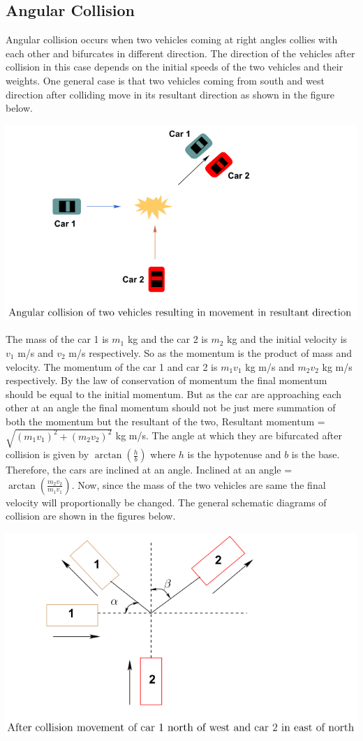 \subsection{Angular Collision}
Angular collision occurs when two vehicles coming at right angles collies with each other and bifurcates in different direction. The direction of the vehicles after collision in this case depends on the initial speeds of the two vehicles and their weights. One general case is that two vehicles coming from south and west direction after colliding move in its resultant direction as shown in the figure below.
\begin{center}
	\includegraphics[scale=0.5]{gfx/fig58.png}
\end{center}
The mass of the car 1 is $ m_1 $ kg and the car 2 is $ m_2 $ kg and the initial velocity is $ v_1 $ m/s and $ v_2 $ m/s respectively. So as the momentum is the product of mass and velocity. The momentum of the car 1 and car 2 is $ m_1 v_1 $ kg m/s and $ m_2v_2 $ kg m/s respectively. By the law of conservation of momentum the final momentum should be equal to the initial momentum. But as the car are approaching each other at an angle the final momentum should not be just mere summation of both the momentum but the resultant of the two, Resultant momentum = $ \sqrt{(m_1 v_1)^2 + (m_2v_2)^2} $ kg m/s. The angle at which they are bifurcated after collision is given by $ \arctan (\frac{h}{b}) $ where $ h $ is the hypotenuse and $ b $ is the base. Therefore, the cars are inclined at an angle. Inclined at an angle = $ \arctan (\frac{m_2v_2}{m_1 v_1}) $. Now, since the mass of the two vehicles are same the final velocity will proportionally be changed. The general schematic diagrams of collision are shown in the figures below.
\begin{center}
	\includegraphics[scale=0.5]{gfx/fig59.png}
\end{center}
